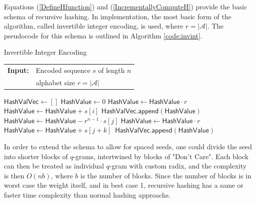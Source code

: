 \documentclass[twoside,a4paper,bsc]{master}
\newcommand{\Qgram}[1]{\(#1\)-gram}
\newcommand{\Append}[0]{\mathsf{append}}
\newcommand{\HashValue}[0]{\mathsf{HashValue}}
\newcommand{\HashValVec}[0]{\mathsf{HashValVec}}
\newcommand{\Alpha}[0]{\mathcal{A}}
\begin{document}
Equations (\ref{DefineHfunction}) and (\ref{IncrementallyComputeH})
provide the basic schema of recursive hashing. In implementation, the most
basic form of the algorithm, called invertible integer encoding, is used,
where \(r=|\Alpha|\). The pseudocode for this schema is
outlined in Algorithm \ref{code:invint}.
\begin{algorithm}[t]
\caption{Invertible Integer Encoding}
\label{code:invint}
\begin{tabular}{@{}l@{~}l}
\textbf{Input:}&Encoded sequence $s$ of length $n$\\
&alphabet size \(r=|\mathcal{A}|\)\\
\end{tabular}
\begin{algorithmic}
\State \(\HashValVec\gets []\)
\State \(\HashValue \gets 0\)
\State \(\HashValue \gets \HashValue \cdot r\)
\State \(\HashValue \gets \HashValue + s[i]\)
\EndFor
\State \(\HashValVec .\Append(\HashValue)\)
\State \(\HashValue \gets \HashValue - r^{n-1}\cdot s[j]\)
\State \(\HashValue \gets \HashValue \cdot r\)
\State \(\HashValue \gets \HashValue + s[j+k]\)\
\State \(\HashValVec .\Append(\HashValue)\)
\EndFor
\end{algorithmic}
\end{algorithm}
In order to extend the schema to allow for spaced seeds, one could divide
the seed into shorter blocks of \Qgram{q}s, intertwined by blocks of
"Don't Care". Each block can then be treated as individual \Qgram{q} with
custom radix, and the complexity is then \(O(nb)\), where \(b\) is the
number of blocks. Since the number of blocks is in worst case the weight
itself, and in best case 1, recursive hashing has a same or faster time
complexity than normal hashing approachs.
\end{document}
